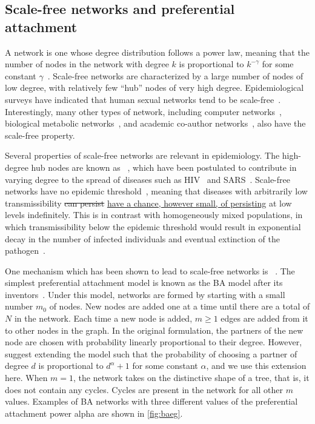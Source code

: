 \subsection{Scale-free networks and preferential attachment}
\label{subsec:pa}

A  network is one whose degree distribution follows a power
law, meaning that the number of nodes in the network with degree $k$ is
proportional to $k^{-\gamma}$ for some constant
$\gamma$~\autocite{barabasi1999emergence}. Scale-free networks are
characterized by a large number of nodes of low degree, with relatively few
``hub'' nodes of very high degree. Epidemiological surveys have indicated that
human sexual networks tend to be scale-free~\autocite{liljeros2001web,
schneeberger2004scale, colgate1989risk, clemenccon2015statistical}.
Interestingly, many other types of network, including computer
networks~\autocite{pastor2001epidemic}, biological metabolic
networks~\autocite{jeong2000large}, and academic co-author
networks~\autocite{barabasi2002evolution}, also have the scale-free property.

Several properties of scale-free networks are relevant in epidemiology.  The
high-degree hub nodes are known as
~\autocite{kemper1980identification}, which have been
postulated to contribute in varying degree to the spread of diseases such as
\gls{HIV}~\autocite{stadler2013uncovering} and
\gls{SARS}~\autocite{shen2004superspreading}. Scale-free networks have no
epidemic threshold~\autocite{pastor2001epidemic}, meaning that diseases with
arbitrarily low transmissibility {\color{red}\sout{can persist}} 
{\color{blue}\uline{have a chance, however small, of persisting}} at low levels
indefinitely. This is in contrast with homogeneously mixed populations, in
which transmissibility below the epidemic threshold would result in exponential
decay in the number of infected individuals and eventual extinction of the
pathogen~\autocite{anderson1992infectious}.

One mechanism which has been shown to lead to scale-free networks is
~\autocite{simon1955class,
barabasi1999emergence}. The simplest preferential attachment model is known as
the \gls{BA} model after its inventors~\autocite{barabasi1999emergence}. Under
this model, networks are formed by starting with a small number $m_0$ of nodes.
New nodes are added one at a time until there are a total of $N$ in the
network. Each time a new node is added, $m \geq 1$ edges are added from it to
other nodes in the graph. In the original formulation, the partners of the new
node are chosen with probability linearly proportional to their degree.
However, \citeauthor{barabasi1999emergence} suggest extending the model such
that the probability of choosing a partner of degree $d$ is proportional to
$d^\alpha + 1$ for some constant $\alpha$, and we use this extension here. When
$m = 1$, the network takes on the distinctive shape of a tree, that is, it does
not contain any cycles. Cycles are present in the network for all other $m$
values. Examples of \gls{BA} networks with three different values of the
preferential attachment power \gls{alpha} are shown in \cref{fig:baeg}.

